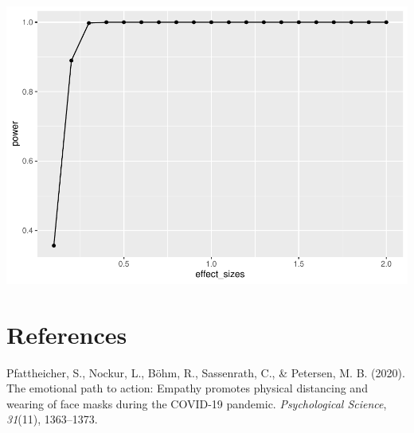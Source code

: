 \documentclass[
  english,
  man]{apa6}
\begin{document}
\includegraphics{APA_Report_files/figure-latex/unnamed-chunk-7-1.pdf}

\newpage

\hypertarget{references}{%
\section*{References}\label{references}}

\hypertarget{refs}{}
\leavevmode\hypertarget{ref-pfattheicher_emotional_2020}{}%
Pfattheicher, S., Nockur, L., Böhm, R., Sassenrath, C., \& Petersen, M. B. (2020). The emotional path to action: Empathy promotes physical distancing and wearing of face masks during the COVID-19 pandemic. \emph{Psychological Science}, \emph{31}(11), 1363--1373.
\end{document}

